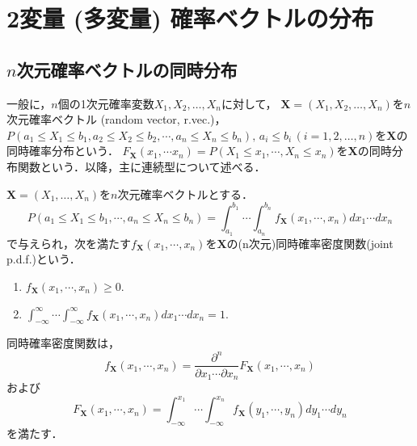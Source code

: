\documentclass{jsreport}
\begin{document}
\chapter{2変量 (多変量) 確率ベクトルの分布}
\section{$n$次元確率ベクトルの同時分布}
一般に，$n$個の1次元確率変数$X_1, X_2, \ldots, X_n$に対して，
$\bm{X} = (X_1, X_2, \ldots, X_n)$を$n$次元確率ベクトル (random vector, r.vec.)，
$P(a_1 \leq X_1 \leq b_1, a_2 \leq X_2 \leq b_2, \cdots, a_n \leq X_n \leq b_n), \, a_i \leq b_i \, (i = 1, 2, \ldots, n)$を$\bm{X}$の同時確率分布という．
$F_{\bm{X}}(x_1, \cdots x_n) = P(X_1 \leq x_1, \cdots, X_n \leq x_n)$を$\bm{X}$の同時分布関数という．以降，主に連続型について述べる．

\begin{screen}
  \begin{defi}[同時確率密度関数]
    $\bm{X} = (X_1, \ldots, X_n)$を$n$次元確率ベクトルとする．
    \begin{equation}
      P(a_1 \leq X_1 \leq b_1, \cdots, a_n \leq X_n \leq b_n) = \int_{a_1}^{b_1} \cdots \int_{a_n}^{b_n} f_{\bm{X}}(x_1, \cdots, x_n) dx_1 \cdots dx_n \nonumber
    \end{equation}
    で与えられ，次を満たす$f_{\bm{X}}(x_1, \cdots, x_n)$を$\bm{X}$の(n次元)同時確率密度関数(joint p.d.f.)という．
    \begin{enumerate}
      \item $f_{\bm{X}}(x_1, \cdots, x_n) \geq 0$.
      \item $\int_{-\infty}^{\infty} \cdots \int_{-\infty}^{\infty} f_{\bm{X}}(x_1, \cdots, x_n) dx_1 \cdots dx_n = 1$.
    \end{enumerate}
  \end{defi}
\end{screen}

同時確率密度関数は，
\begin{equation}
  f_{\bm{X}}(x_1, \cdots, x_n) = \frac{\partial^n}{\partial x_1 \cdots \partial x_n} F_{\bm{X}}(x_1, \cdots, x_n) \nonumber
\end{equation}
および
\begin{equation}
  F_{\bm{X}}(x_1, \cdots, x_n) = \int_{-\infty}^{x_1} \cdots \int_{-\infty}^{x_n} f_{\bm{X}}(y_1, \cdots, y_n) dy_1 \cdots dy_n \nonumber
\end{equation}
を満たす．
\end{document}
